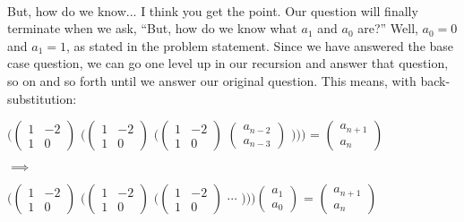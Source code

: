 \documentclass{article}
\begin{document}
        \paragraph{}
        	But, how do we know... I think you get the point. 
            Our question will finally terminate when we ask, ``But, how do we know what $a_1$ and $a_0$ are?'' 
            Well, $a_0 = 0$ and $a_1 = 1$, as stated in the problem statement. 
            Since we have answered the base case question, 
            	we can go one level up in our recursion and answer that question,
                	so on and so forth until we answer our original question.
            This means, with back-substitution:
            \begin{center}
            	$\biggl($\(\begin{pmatrix}1 & -2\\1 & 0\end{pmatrix}\)
                	$\biggl($\(\begin{pmatrix}1 & -2\\1 & 0\end{pmatrix}\)
                    	$\biggl($\(\begin{pmatrix}1 & -2\\1 & 0\end{pmatrix}\)
                        	\(\begin{pmatrix}a_{n-2}\\a_{n-3}\end{pmatrix}\)
                        $\biggr)\biggr)\biggr)$ = 
                	\(\begin{pmatrix}a_{n+1}\\a_{n}\end{pmatrix}\)\\
            \end{center}
            $\implies$
            \begin{center}
            	$\biggl($\(\begin{pmatrix}1 & -2\\1 & 0\end{pmatrix}\)
                	$\biggl($\(\begin{pmatrix}1 & -2\\1 & 0\end{pmatrix}\)
                    	$\biggl($\(\begin{pmatrix}1 & -2\\1 & 0\end{pmatrix}\)
                        	$\cdots$
                        $\biggr)\biggr)\biggr)$\(\begin{pmatrix}a_{1}\\a_{0}\end{pmatrix}\) = 
                	\(\begin{pmatrix}a_{n+1}\\a_{n}\end{pmatrix}\)\\
            \end{center}
\end{document}
